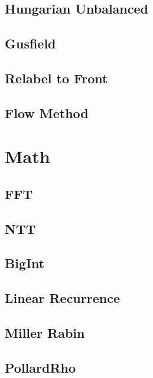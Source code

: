 \documentclass[10pt,twocolumn,oneside]{article}
\begin{document}
\subsection{Hungarian Unbalanced}


\subsection{Gusfield}


\subsection{Relabel to Front}


\subsection{Flow Method}


\section{Math}
\subsection{FFT}


\subsection{NTT}


\subsection{BigInt}


\subsection{Linear Recurrence}


\subsection{Miller Rabin}


\subsection{PollardRho}

\end{document}
